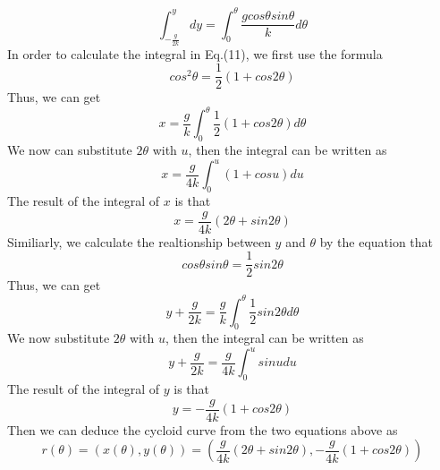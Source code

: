 \documentclass[12pt,a4paper]{article}
\begin{document}
\begin{equation}
    \int_{-\frac{g}{2k}}^ydy = \int_0^{\theta}\frac{gcos\theta{sin}\theta}{k}d\theta
\end{equation}
In order to calculate the integral in Eq.(11), we first use the formula 
$$cos^2\theta = \frac{1}{2}(1+cos2\theta)$$
Thus, we can get
$$x = \frac{g}{k}\int_0^{\theta}\frac{1}{2}(1+cos2\theta)d\theta$$
We now can substitute $2\theta$ with $u$, then the integral can be written as 
$$x = \frac{g}{4k}\int_0^{u}(1+cosu)du$$
The result of the integral of $x$ is that
\begin{equation}
    x = \frac{g}{4k}(2\theta+sin2\theta)
\end{equation}
Similiarly, we calculate the realtionship between $y$ and $\theta$ by the equation that 
$$cos\theta{sin}\theta = \frac{1}{2}sin2\theta$$
Thus, we can get
$$y + \frac{g}{2k} = \frac{g}{k}\int_0^{\theta}\frac{1}{2}sin2\theta{d}\theta$$
We now substitute $2\theta$ with $u$, then the integral can be written as 
$$y + \frac{g}{2k} = \frac{g}{4k}\int_0^{u}sinudu$$
The result of the integral of $y$ is that
\begin{equation}
    y = -\frac{g}{4k}(1+cos2\theta)
\end{equation}
Then we can deduce the cycloid curve from the two equations above as
\begin{equation}
    r(\theta) = (x(\theta),y(\theta)) = (\frac{g}{4k}(2\theta+sin2\theta),-\frac{g}{4k}(1+cos2\theta))
\end{equation}
\end{document}
